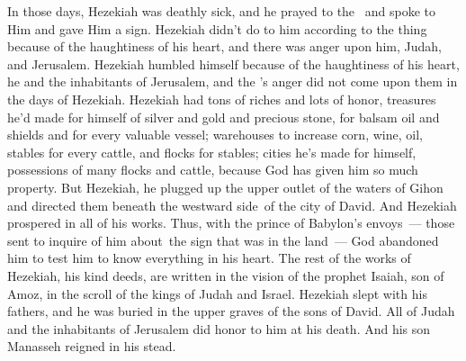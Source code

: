 \begin{inparaenum}
   In those days, Hezekiah was deathly sick, and he prayed to the \lord\ and spoke to Him and gave Him a sign.%
   Hezekiah didn't do to him according to the thing because of the haughtiness of his heart, and there was anger upon him, Judah, and Jerusalem.%
   Hezekiah humbled himself because of the haughtiness of his heart, he and the inhabitants of Jerusalem, and the \lord's anger did not come upon them in the days of Hezekiah.%
   Hezekiah had tons of riches and lots of honor, treasures he'd made for himself of silver and gold and precious stone, for balsam oil and shields and for every valuable vessel;%
   warehouses to increase corn, wine, oil, stables for every cattle, and flocks for stables;%
   cities he's made for himself, possessions of many flocks and cattle, because God has given him so much property.%
   But Hezekiah, he plugged up the upper outlet of the waters of Gihon and directed them beneath the westward side\understood{}\ of the city of David. And Hezekiah prospered in all of his works.%
   Thus, with the prince of Babylon's envoys~--- those sent to inquire of him about\understood{}\ the sign that was in the land~--- God abandoned him to test him to know everything in his heart.%
   The rest of the works of Hezekiah, his kind deeds, are written in the vision of the prophet Isaiah, son of Amoz, in the scroll of the kings of Judah and Israel.%
   Hezekiah slept with his fathers, and he was buried in the upper graves of the sons of David. All of Judah and the inhabitants of Jerusalem did honor to him at his death. And his son Manasseh reigned in his stead.%
\end{inparaenum}
